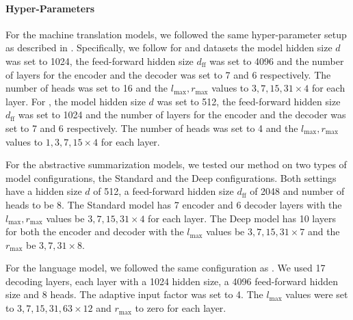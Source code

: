 \documentclass{article}
\begin{document}
\paragraph{Hyper-Parameters} For the machine translation models, we followed the same hyper-parameter setup as described in \citet{wu2019pay}. Specifically, we follow for \ende{} and \enfr{} datasets the model hidden size $d$ was set to 1024, the feed-forward hidden size $d_{\text{ff}}$ was set to 4096 and the number of layers for the encoder and the decoder was set to 7 and 6 respectively. The number of heads was set to 16 and the $l_\text{max}, r_\text{max}$ values to $3,7,15,31{\times}4$ for each layer. For \iwslt{}, the model hidden size $d$ was set to 512, the feed-forward hidden size $d_{\text{ff}}$ was set to 1024 and the number of layers for the encoder and the decoder was set to 7 and 6 respectively. The number of heads was set to 4 and the $l_\text{max}, r_\text{max}$ values to $1,3,7,15{\times}4$ for each layer.

For the abstractive summarization models, we tested our method on two types of model configurations, the Standard and the Deep configurations. Both settings have a hidden size $d$ of 512, a feed-forward hidden size $d_{\text{ff}}$ of 2048 and number of heads to be 8. The Standard model has 7 encoder and 6 decoder layers with the $l_\text{max}, r_\text{max}$ values be $3,7,15,31{\times}4$ for each layer. The Deep model has 10 layers for both the encoder and decoder with the $l_\text{max}$ values be $3,7,15,31{\times}7$ and the $r_\text{max}$ be $3,7,31{\times}8$.

For the language model, we followed the same configuration as \citet{DBLP:journals/corr/abs-1809-10853}. We used 17 decoding layers, each layer with a 1024 hidden size, a 4096 feed-forward hidden size and 8 heads. The adaptive input factor was set to 4. The $l_\text{max}$ values were set to $3,7,15,31,63{\times}12$ and $r_\text{max}$ to zero for each layer.
\end{document}
